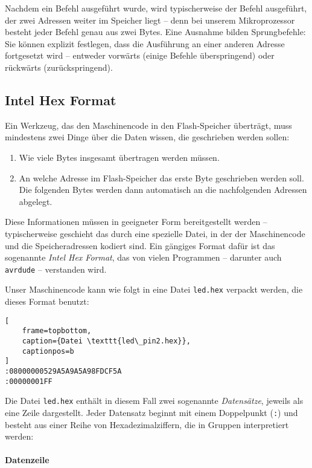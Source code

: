 \documentclass[a4paper,12pt]{article}
\begin{document}
Nachdem ein Befehl ausgeführt wurde, wird typischerweise der Befehl ausgeführt,
der zwei Adressen weiter im Speicher liegt – denn bei unserem Mikroprozessor
besteht jeder Befehl genau aus zwei Bytes.  Eine Ausnahme bilden Sprungbefehle:
Sie können explizit festlegen, dass die Ausführung an einer anderen Adresse
fortgesetzt wird – entweder vorwärts (einige Befehle überspringend) oder
rückwärts (zurückspringend).

\subsection{Intel Hex Format}
Ein Werkzeug, das den Maschinencode in den Flash-Speicher überträgt, muss
mindestens zwei Dinge über die Daten wissen, die geschrieben werden sollen:

\begin{enumerate}
    \item
	Wie viele Bytes insgesamt übertragen werden müssen.
    \item
	An welche Adresse im Flash-Speicher das erste Byte geschrieben werden
	soll. Die folgenden Bytes werden dann automatisch an die nachfolgenden
	Adressen abgelegt.
\end{enumerate}
Diese Informationen müssen in geeigneter Form bereitgestellt werden –
typischerweise geschieht das durch eine spezielle Datei, in der der
Maschinencode und die Speicheradressen kodiert sind. Ein gängiges Format dafür
ist das sogenannte \emph{Intel Hex Format}, das von vielen Programmen –
darunter auch \texttt{avrdude} – verstanden wird.

Unser Maschinencode kann wie folgt in eine Datei \texttt{led.hex} verpackt
werden, die dieses Format benutzt:

\begin{lstlisting}[
    frame=topbottom,
    caption={Datei \texttt{led\_pin2.hex}},
    captionpos=b
]
:08000000529A5A9A5A98FDCF5A
:00000001FF
\end{lstlisting}

\noindent
Die Datei \texttt{led.hex} enthält in diesem Fall zwei sogenannte
\emph{Datensätze}, jeweils als eine Zeile dargestellt. Jeder Datensatz beginnt
mit einem Doppelpunkt (\texttt{:}) und besteht aus einer Reihe von
Hexadezimalziffern, die in Gruppen interpretiert werden:

\paragraph{Datenzeile}
\end{document}
